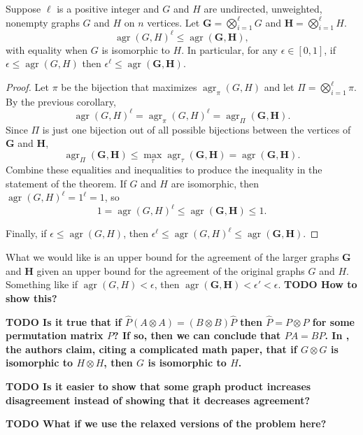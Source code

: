 \documentclass{article}
\newcommand{\todo}[1]{\textbf{TODO #1}}
\newcommand{\1}{\mathbf{1}}
\DeclareMathOperator{\agr}{agr}
\begin{document}
\begin{theorem}
  Suppose $\ell$ is a positive integer and $G$ and $H$ are undirected, unweighted, nonempty graphs $G$ and $H$ on $n$ vertices.
  Let $\mathbf{G} = \bigotimes_{i = 1}^\ell G$ and $\mathbf{H} = \bigotimes_{i = 1}^\ell H$.
  \begin{equation*}
    \agr(G, H)^\ell \leq \agr(\mathbf{G}, \mathbf{H}),
  \end{equation*}
  with equality when $G$ is isomorphic to $H$.
  In particular, for any $\epsilon \in [0, 1]$, if $\epsilon \leq \agr(G, H)$ then $\epsilon^\ell \leq \agr(\mathbf{G}, \mathbf{H})$.
\end{theorem}
\begin{proof}
  Let $\pi$ be the bijection that maximizes $\agr_\pi(G, H)$ and let $\Pi = \bigotimes_{i = 1}^\ell \pi$.
  By the previous corollary,
  \begin{equation*}
    \agr(G, H)^\ell = \agr_\pi(G, H)^\ell = \agr_\Pi(\mathbf{G}, \mathbf{H}).
  \end{equation*}
  Since $\Pi$ is just one bijection out of all possible bijections between the vertices of $\mathbf{G}$ and $\mathbf{H}$,
  \begin{equation*}
    \agr_\Pi(\mathbf{G}, \mathbf{H}) \leq \max_\tau \agr_\tau(\mathbf{G}, \mathbf{H}) = \agr(\mathbf{G}, \mathbf{H}).
  \end{equation*}
  Combine these equalities and inequalities to produce the inequality in the statement of the theorem.
  If $G$ and $H$ are isomorphic, then $\agr(G, H)^\ell = 1^\ell = 1$, so
  \begin{equation*}
    1 = \agr(G, H)^\ell \leq \agr(\mathbf{G}, \mathbf{H}) \leq 1.
  \end{equation*}

  Finally, if $\epsilon \leq \agr(G, H)$, then $\epsilon^\ell \leq \agr(G, H)^\ell \leq \agr(\mathbf{G}, \mathbf{H})$.
\end{proof}

What we would like is an upper bound for the agreement of the larger graphs $\mathbf{G}$ and $\mathbf{H}$ given an upper bound for the agreement of the original graphs $G$ and $H$.
Something like if $\agr(G, H) < \epsilon$, then $\agr(\mathbf{G}, \mathbf{H}) < \epsilon' < \epsilon$.
\todo{How to show this?}

\todo{
  Is it true that if $\hat{P}(A \otimes A) = (B \otimes B)\hat{P}$ then $\hat{P} = P \otimes P$ for some permutation matrix $P$?
  If so, then we can conclude that $PA = BP$.
  In \autocite{owwz14}, the authors claim, citing a complicated \oldstylenums{1971} math paper, that if $G \otimes G$ is isomorphic to $H \otimes H$, then $G$ is isomorphic to $H$.
}

\todo{Is it easier to show that some graph product increases disagreement instead of showing that it decreases agreement?}

\todo{What if we use the relaxed versions of the problem here?}

\printbibliography
\end{document}
